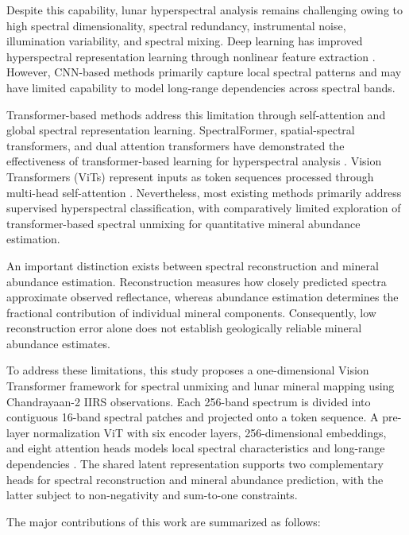 \documentclass[runningheads]{llncs}
\begin{document}
Despite this capability, lunar hyperspectral analysis remains
challenging owing to high spectral dimensionality, spectral
redundancy, instrumental noise, illumination variability, and spectral
mixing. Deep learning has improved hyperspectral
representation learning through nonlinear feature extraction
\cite{zhang2016deeplearning,paoletti2019review}. However, CNN-based
methods primarily capture local spectral patterns and may have limited
capability to model long-range dependencies across spectral bands.

Transformer-based methods address this limitation through self-attention
and global spectral representation learning. SpectralFormer,
spatial-spectral transformers, and dual attention transformers have
demonstrated the effectiveness of transformer-based learning for
hyperspectral analysis \cite{hong2022spectralformer,he2021sst,shu2024datn}.
Vision Transformers (ViTs) represent inputs as token sequences
processed through multi-head self-attention
\cite{dosovitskiy2021vit}. Nevertheless, most existing methods
primarily address supervised hyperspectral classification, with
comparatively limited exploration of transformer-based spectral
unmixing for quantitative mineral abundance estimation.

An important distinction exists between spectral reconstruction and
mineral abundance estimation. Reconstruction measures how closely
predicted spectra approximate observed reflectance, whereas abundance
estimation determines the fractional contribution of individual mineral
components. Consequently, low reconstruction error alone does not
establish geologically reliable mineral abundance estimates.

To address these limitations, this study proposes a one-dimensional
Vision Transformer framework for spectral unmixing and lunar mineral
mapping using Chandrayaan-2 IIRS observations. Each 256-band spectrum is
divided into contiguous 16-band spectral patches and projected onto a
token sequence. A pre-layer normalization ViT with six encoder layers,
256-dimensional embeddings, and eight attention heads models local
spectral characteristics and long-range dependencies
\cite{dosovitskiy2021vit,xiong2020layernorm}. The shared latent
representation supports two complementary heads for spectral
reconstruction and mineral abundance prediction, with the latter
subject to non-negativity and sum-to-one constraints.

The major contributions of this work are summarized as follows:
\end{document}
